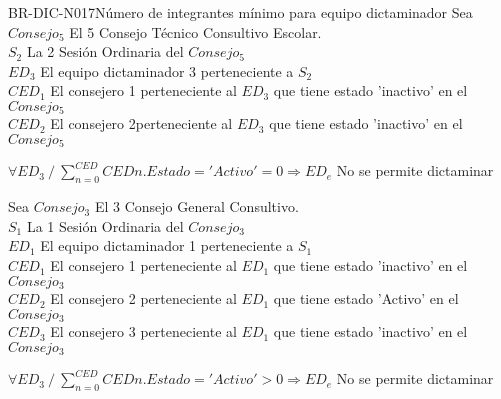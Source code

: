 \begin{BusinessRule}{BR-DIC-N017}{Número de integrantes mínimo para equipo dictaminador }
		Sea $Consejo_{5}$ El 5 Consejo Técnico Consultivo Escolar.\\
	$S_{2}$ La 2 Sesión Ordinaria del $Consejo_{5}$\\
	$ED_{3}$ El equipo dictaminador 3  perteneciente a $S_{2}$ \\
	$CED_{1}$ El consejero 1 perteneciente al $ED_{3}$ que tiene estado 'inactivo' en el $Consejo_{5}$\\ 
	$CED_{2}$ El consejero 2perteneciente al $ED_{3}$ que tiene estado 'inactivo' en el $Consejo_{5}$\\ 
	\begin{center}
		$ \forall  ED_{3} \: / \: \sum_{n=0}^{CED}CED{n}.{Estado='Activo'} = 0 \Rightarrow ED_{e} $ No se permite dictaminar 
	\end{center}
Sea $Consejo_{3}$ El 3 Consejo General Consultivo.\\
$S_{1}$ La 1 Sesión Ordinaria del $Consejo_{3}$\\
$ED_{1}$ El equipo dictaminador 1 perteneciente a $S_{1}$ \\
$CED_{1}$ El consejero 1 perteneciente al $ED_{1}$ que tiene estado 'inactivo' en el $Consejo_{3}$\\ 
$CED_{2}$ El consejero 2 perteneciente al $ED_{1}$ que tiene estado 'Activo' en el $Consejo_{3}$\\ 
$CED_{3}$ El consejero 3 perteneciente al $ED_{1}$ que tiene estado 'inactivo' en el $Consejo_{3}$\\ 
\begin{center}
	$ \forall  ED_{3} \: / \: \sum_{n=0}^{CED}CED{n}.{Estado='Activo'} > 0 \Rightarrow ED_{e} $ No se permite dictaminar 
\end{center}

	
\end{BusinessRule}

